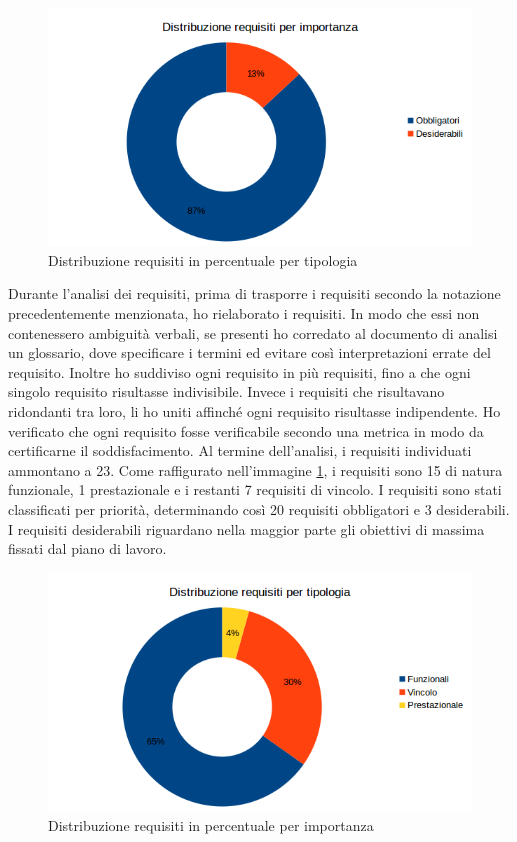 \begin{figure}[h]
\centering
\includegraphics[scale=0.72]{immagini/distribuzionereqi}
\caption{Distribuzione requisiti in percentuale per tipologia}
\label{fig:distr-req-tip}
\end{figure}
Durante l'analisi dei requisiti, prima di trasporre i requisiti secondo la notazione precedentemente menzionata, ho rielaborato i requisiti. In modo che essi non contenessero ambiguità verbali, se presenti ho corredato al documento di analisi un glossario, dove specificare i termini ed evitare così interpretazioni errate del requisito. Inoltre ho suddiviso ogni requisito in più requisiti, fino a che ogni singolo requisito risultasse indivisibile. Invece i requisiti che risultavano ridondanti tra loro, li ho uniti affinché ogni requisito risultasse indipendente. Ho verificato che ogni requisito fosse verificabile secondo una metrica in modo da certificarne il soddisfacimento. Al termine dell'analisi, i requisiti individuati ammontano a 23. Come raffigurato nell'immagine \ref{fig:distr-req-tip}, i requisiti sono 15 di natura funzionale, 1 prestazionale e i restanti 7 requisiti di vincolo. I requisiti sono stati classificati per priorità, determinando così 20 requisiti obbligatori e 3 desiderabili. I requisiti desiderabili riguardano nella maggior parte gli obiettivi di massima fissati dal piano di lavoro. %
\begin{figure}[h]
\centering
\includegraphics[scale=0.72]{immagini/distribuzionereqt}
\caption{Distribuzione requisiti in percentuale per importanza}
\label{fig:distr-req-imp}
\end{figure}

